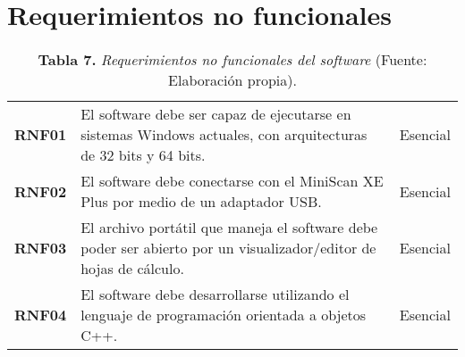 \section{Requerimientos no funcionales}
\FloatBarrier
	\begin{table}[htb]
		\small
		\caption{\textbf{Tabla 7.} \textit{Requerimientos no funcionales del software} (Fuente: Elaboraci\'{o}n propia).}
		\centering
		\setlength{\extrarowheight}{\altocelda}
		\begin{tabulary}{\anchotabla}{|c|J|c|}
			\hline
			 &  & \\ \hline
			\textbf{RNF01} & El software debe ser capaz de ejecutarse en sistemas Windows actuales, con arquitecturas de 32 bits y 64 bits. & Esencial\\ \hline
			\textbf{RNF02} & El software debe conectarse con el MiniScan XE Plus por medio de un adaptador USB. & Esencial\\ \hline
			\textbf{RNF03} & El archivo port\'{a}til que maneja el software debe poder ser abierto por un visualizador/editor de hojas de c\'{a}lculo. & Esencial\\ \hline
			\textbf{RNF04} & El software debe desarrollarse utilizando el lenguaje de programaci\'{o}n orientada a objetos C++. & Esencial\\ \hline
		\end{tabulary}
	\end{table}
\FloatBarrier %